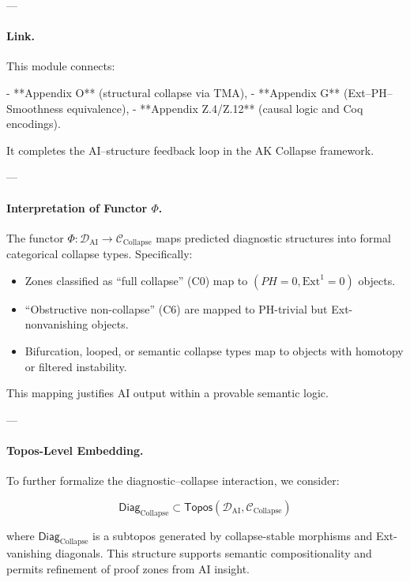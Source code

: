\documentclass[11pt]{article}
\begin{document}
\begin{axiom}
\begin{axiom}
{{---

\paragraph{Link.}  
This module connects:

- **Appendix O** (structural collapse via TMA),
- **Appendix G** (Ext–PH–Smoothness equivalence),
- **Appendix Z.4/Z.12** (causal logic and Coq encodings).

It completes the AI–structure feedback loop in the AK Collapse framework.


---

\paragraph{Interpretation of Functor $\Phi$.}

The functor $\Phi : \mathcal{D}_{\text{AI}} \to \mathcal{C}_{\text{Collapse}}$ maps predicted diagnostic structures  
into formal categorical collapse types. Specifically:

\begin{itemize}
  \item Zones classified as “full collapse” (C0) map to $(PH=0, \mathrm{Ext}^1 = 0)$ objects.
  \item “Obstructive non-collapse” (C6) are mapped to PH-trivial but Ext-nonvanishing objects.
  \item Bifurcation, looped, or semantic collapse types map to objects with homotopy or filtered instability.
\end{itemize}

This mapping justifies AI output within a provable semantic logic.

---

\paragraph{Topos-Level Embedding.}

To further formalize the diagnostic–collapse interaction, we consider:

\[
\mathsf{Diag}_{\text{Collapse}} \subset \mathsf{Topos}(\mathcal{D}_{\text{AI}}, \mathcal{C}_{\text{Collapse}})
\]

where $\mathsf{Diag}_{\text{Collapse}}$ is a subtopos generated by collapse-stable morphisms  
and Ext-vanishing diagonals. This structure supports semantic compositionality  
and permits refinement of proof zones from AI insight.

}}
\end{axiom}
\end{axiom}
\end{document}

